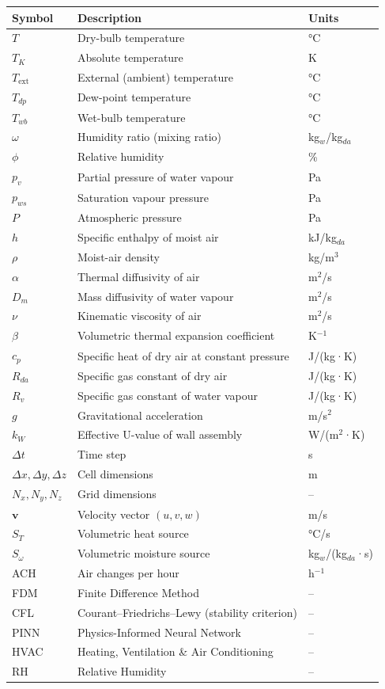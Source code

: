 \documentclass[12pt,a4paper]{report}
\begin{document}
\begin{longtable}{p{2.5cm} p{8.5cm} p{3cm}}
\toprule
\textbf{Symbol} & \textbf{Description} & \textbf{Units}\\
\midrule
\endhead
$T$ & Dry-bulb temperature & °C\\
$T_K$ & Absolute temperature & K\\
$T_\text{ext}$ & External (ambient) temperature & °C\\
$T_{dp}$ & Dew-point temperature & °C\\
$T_{wb}$ & Wet-bulb temperature & °C\\
$\omega$ & Humidity ratio (mixing ratio) & kg$_w$/kg$_{da}$\\
$\phi$ & Relative humidity & \%\\
$p_v$ & Partial pressure of water vapour & Pa\\
$p_{ws}$ & Saturation vapour pressure & Pa\\
$P$ & Atmospheric pressure & Pa\\
$h$ & Specific enthalpy of moist air & kJ/kg$_{da}$\\
$\rho$ & Moist-air density & kg/m$^3$\\
$\alpha$ & Thermal diffusivity of air & m$^2$/s\\
$D_m$ & Mass diffusivity of water vapour & m$^2$/s\\
$\nu$ & Kinematic viscosity of air & m$^2$/s\\
$\beta$ & Volumetric thermal expansion coefficient & K$^{-1}$\\
$c_p$ & Specific heat of dry air at constant pressure & J/(kg·K)\\
$R_{da}$ & Specific gas constant of dry air & J/(kg·K)\\
$R_v$ & Specific gas constant of water vapour & J/(kg·K)\\
$g$ & Gravitational acceleration & m/s$^2$\\
$k_W$ & Effective U-value of wall assembly & W/(m$^2$·K)\\
$\Delta t$ & Time step & s\\
$\Delta x, \Delta y, \Delta z$ & Cell dimensions & m\\
$N_x, N_y, N_z$ & Grid dimensions & --\\
$\mathbf{v}$ & Velocity vector $(u,v,w)$ & m/s\\
$S_T$ & Volumetric heat source & °C/s\\
$S_\omega$ & Volumetric moisture source & kg$_w$/(kg$_{da}$·s)\\
ACH & Air changes per hour & h$^{-1}$\\
FDM & Finite Difference Method & --\\
CFL & Courant--Friedrichs--Lewy (stability criterion) & --\\
PINN & Physics-Informed Neural Network & --\\
HVAC & Heating, Ventilation \& Air Conditioning & --\\
RH & Relative Humidity & --\\
\bottomrule
\end{longtable}
\end{document}
